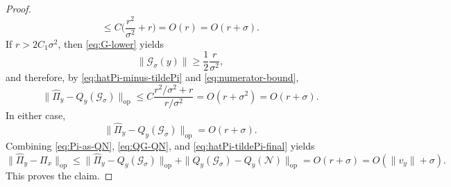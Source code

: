 \documentclass[11pt]{article}
\theoremstyle{plain}
\theoremstyle{definition}
\begin{document}
\begin{proof}
\[\le
C\big(\frac{r^2}{\sigma^2}+r\big)
=
O(r)
=
O(r+\sigma).
\]
If $r>2C_1\sigma^2$, then \eqref{eq:G-lower} yields
\[
\|\mathcal G_\sigma(y)\|\ge \frac12\frac{r}{\sigma^2},
\]
and therefore, by \eqref{eq:hatPi-minus-tildePi} and \eqref{eq:numerator-bound},
\[
\|\widehat\Pi_y-Q_y(\mathcal G_\sigma)\|_{\mathrm{op}}
\le
C
\frac{r^2/\sigma^2+r}{r/\sigma^2}
=
O(r+\sigma^2)
=
O(r+\sigma).
\]
In either case,
\begin{equation}\label{eq:hatPi-tildePi-final}
\|\widehat\Pi_y-Q_y(\mathcal G_\sigma)\|_{\mathrm{op}}=O(r+\sigma).
\end{equation}
Combining \eqref{eq:Pi-as-QN}, \eqref{eq:QG-QN}, and \eqref{eq:hatPi-tildePi-final} yields
\[
\|\widehat\Pi_y-\Pi_x\|_{\mathrm{op}}
\le
\|\widehat\Pi_y-Q_y(\mathcal G_\sigma)\|_{\mathrm{op}}
+
\|Q_y(\mathcal G_\sigma)-Q_y(\mathcal N)\|_{\mathrm{op}} = O(r+\sigma)
=
O(\|v_y\|+\sigma).
\] 
This proves the claim.
\end{proof}
\end{document}
